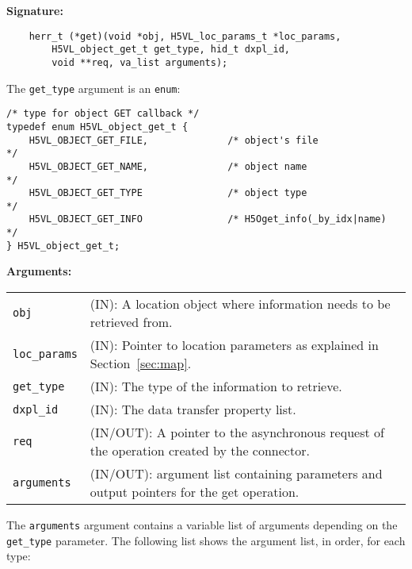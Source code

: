 \begin{mdframed}[style=bgbox]
\textbf{Signature:}
\begin{lstlisting}
    herr_t (*get)(void *obj, H5VL_loc_params_t *loc_params, 
        H5VL_object_get_t get_type, hid_t dxpl_id, 
        void **req, va_list arguments);
\end{lstlisting}

The \texttt{get\_type} argument is an \texttt{enum}:
\begin{lstlisting}
/* type for object GET callback */
typedef enum H5VL_object_get_t {                                                 
    H5VL_OBJECT_GET_FILE,              /* object's file                     */  
    H5VL_OBJECT_GET_NAME,              /* object name                       */  
    H5VL_OBJECT_GET_TYPE               /* object type                       */  
    H5VL_OBJECT_GET_INFO               /* H5Oget_info(_by_idx|name)         */
} H5VL_object_get_t; 
\end{lstlisting}

\textbf{Arguments:}\\
\begin{tabular}{l p{13.5cm}}
  \texttt{obj} & (IN): A location object where information needs to be
  retrieved from.\\
  \texttt{loc\_params} & (IN): Pointer to location parameters as
  explained in Section~\ref{sec:map}.\\
  \texttt{get\_type} & (IN): The type of the information to retrieve.\\
  \texttt{dxpl\_id} & (IN): The data transfer property list.\\
  \texttt{req} & (IN/OUT): A pointer to the asynchronous request of the
  operation created by the connector.\\
  \texttt{arguments} & (IN/OUT): argument list containing parameters and
  output pointers for the get operation. \\
\end{tabular}
\end{mdframed}

The \texttt{arguments} argument contains a variable list of arguments
depending on the \texttt{get\_type} parameter. The following list shows
the argument list, in order, for each type:


